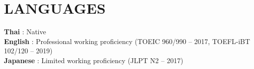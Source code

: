 \section{LANGUAGES}
 \begin{itemize}[leftmargin=0in, label={}]
    \small{\item{
     \textbf{Thai} {: Native}\vspace{2pt} \\
     \textbf{English} {: Professional working proficiency (TOEIC 960/990 -- 2017, TOEFL-iBT 102/120 -- 2019)} \vspace{2pt} \\
     \textbf{Japanese}     {: Limited working proficiency (JLPT N2 -- 2017)} \\
    }}
 \end{itemize}
